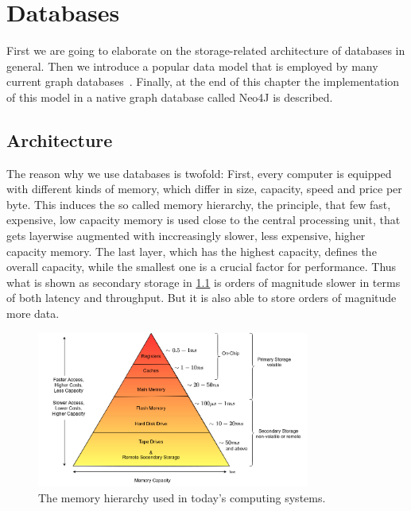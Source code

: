 \chapter{Databases}
First we are going to elaborate on the storage-related architecture of databases in general.
    Then we introduce a popular data model that is employed by many current graph databases~\autocite{GitHubneo4j, ArangoDB, AmazonNeptune, RedisGraph}.
    Finally, at the end of this chapter the implementation of this model in a native graph database called Neo4J is described.
    
\section{Architecture}\label{db-arch}
    The reason why we use databases is twofold:
    First, every computer is equipped with different kinds of memory, which differ in size, capacity, speed and price per byte. 
    This induces the so called memory hierarchy, the principle, that few fast, expensive, low capacity memory is used close to the central processing unit, that gets layerwise augmented with inccreasingly slower, less expensive, higher capacity memory. 
    The last layer, which has the highest capacity, defines the overall capacity, while the smallest one is a crucial factor for performance.
    Thus what is shown as secondary storage in \ref{mem-hier} is orders of magnitude slower in terms of both latency and throughput.
    But it is also able to store orders of magnitude more data. 
    \begin{figure}[htp]
        \begin{center}
        \includegraphics[keepaspectratio,width=0.8\textwidth]{img/04-databases/mem-hierarch.png}
        \end{center}
        \caption{The memory hierarchy used in today's computing systems.} 
        \label{mem-hier}
    \end{figure}
